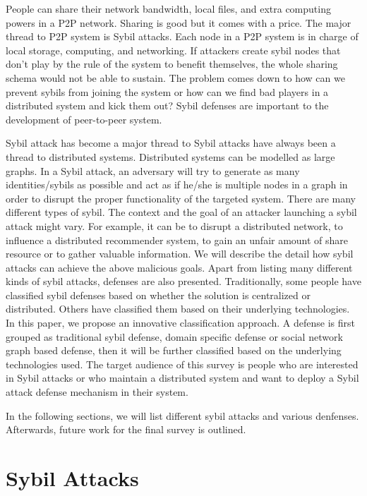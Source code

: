 \documentclass[conference]{IEEEtran}
\begin{document}
People can share their network bandwidth, local files, and extra computing powers in a P2P network. 
Sharing is good but it comes with a price. The major thread to P2P system is Sybil attacks.
Each node in a P2P system is in charge of local storage, computing, and networking.
If attackers create sybil nodes that don't play by the rule of the system to benefit themselves, the whole sharing schema would not be able to sustain.
The problem comes down to how can we prevent sybils from joining the system or how can we find bad players in a distributed system and kick them out?
Sybil defenses are important to the development of peer-to-peer system. 

Sybil attack has become a major thread to 
Sybil attacks have always been a thread to distributed systems.
Distributed systems can be modelled as large graphs.
In a Sybil attack, an adversary will try to generate as many identities/sybils as possible and act as if he/she is multiple nodes in a graph in order to disrupt the proper functionality of the targeted system. 
There are many different types of sybil. 
The context and the goal of an attacker launching a sybil attack might vary. For example, it can be to disrupt a distributed network, to influence a distributed recommender system, to gain an unfair amount of share resource or to gather valuable information.
We will describe the detail how sybil attacks can achieve the above malicious goals. Apart from listing many different kinds of sybil attacks, defenses are also presented.
Traditionally, some people have classified sybil defenses based on whether the solution is centralized or distributed.
Others have classified them based on their underlying technologies. In this paper, we propose an innovative classification approach. 
A defense is first grouped as traditional sybil defense, domain specific defense or social network graph based defense, then it will be further classified based on the underlying technologies used. The target audience of this survey is people who are interested in Sybil attacks or who maintain a distributed system and want to deploy a Sybil attack defense mechanism in their system.

In the following sections, we will list different sybil attacks and various denfenses. Afterwards, future work for the final survey is outlined.

\section{Sybil Attacks}
\end{document}
